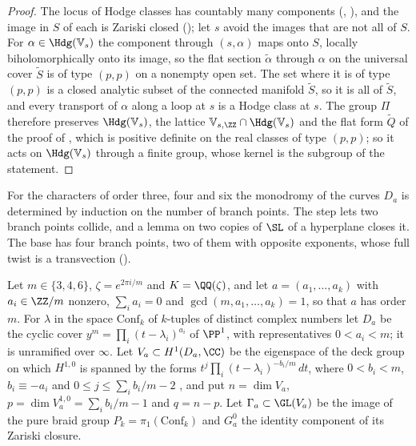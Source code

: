 \begin{proof}
The locus of Hodge classes has countably many components
(\cite[Definition~B.3]{paperI}, \cite[Lemma~B.4]{paperI}), and the image in $S$ of
each is Zariski closed (\cite[Theorem~B.6]{paperI}); let $s$ avoid the images that are
not all of $S$. For $\alpha\in\Hdg(\mathbb{V}_{s})$ the component through
$(s,\alpha)$ maps onto $S$, locally biholomorphically onto its image, so the
flat section $\tilde\alpha$ through $\alpha$ on the universal cover $\tilde S$
is of type $(p,p)$ on a nonempty open set. The set where it is of type
$(p,p)$ is a closed analytic subset of the connected manifold $\tilde S$, so it
is all of $\tilde S$, and every transport of $\alpha$ along a loop at $s$ is a
Hodge class at $s$. The group $\Pi$ therefore preserves
$\Hdg(\mathbb{V}_{s})$, the lattice $\mathbb{V}_{s,\ZZ}\cap\Hdg(\mathbb{V}_{s})$
and the flat form $\tilde Q$ of the proof of \cite[Lemma~B.5]{paperI}, which is
positive definite on the real classes of type $(p,p)$; so it acts on
$\Hdg(\mathbb{V}_{s})$ through a finite group, whose kernel is the subgroup
of the statement.
\end{proof}

For the characters of order three, four and six the monodromy of the
curves $D_{a}$ is determined by induction on the number of branch points. The
step lets two branch points collide, and a lemma on two copies of $\SL$ of a
hyperplane closes it. The base has four branch points, two of them with
opposite exponents, whose full twist is a transvection
().

\begin{setupenv}\label{setup:cyclic}
Let $m\in\{3,4,6\}$, $\zeta=e^{2\pi i/m}$ and $K=\QQ(\zeta)$, and let
$a=(a_{1},\dots,a_{k})$ with $a_{i}\in\ZZ/m$ nonzero, $\sum_{i}a_{i}=0$ and
$\gcd(m,a_{1},\dots,a_{k})=1$, so that $a$ has order $m$. For $\lambda$ in
the space $\mathrm{Conf}_{k}$ of $k$-tuples of distinct complex numbers let
$D_{a}$ be the cyclic cover $y^{m}=\prod_{i}(t-\lambda_{i})^{a_{i}}$ of
$\PP^{1}$, with representatives $0<a_{i}<m$; it is unramified over
$\infty$. Let $V_{a}\subset H^{1}(D_{a},\CC)$ be the eigenspace of the deck
group on which $H^{1,0}$ is spanned by the forms
$t^{j}\prod_{i}(t-\lambda_{i})^{-b_{i}/m}\,dt$, where $0<b_{i}<m$, $b_{i}\equiv
-a_{i}$ and $0\le j\le\sum_{i}b_{i}/m-2$ \cite[\S2]{DM86}, and put
$n=\dim V_{a}$,
$p=\dim V_{a}^{1,0}=\sum_{i}b_{i}/m-1$ and $q=n-p$. Let $\Gamma_{a}\subset
\GL(V_{a})$ be the image of the pure braid group
$P_{k}=\pi_{1}(\mathrm{Conf}_{k})$ and $G_{a}^{0}$ the identity component of
its Zariski closure.
\end{setupenv}

